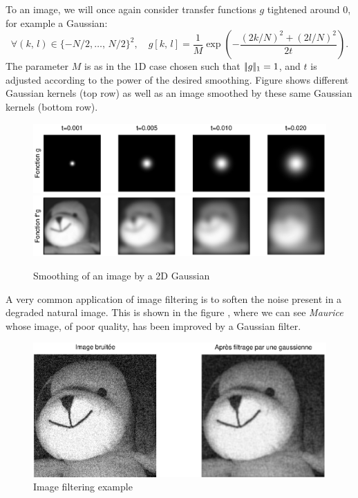  
To  an image, we will once again consider transfer functions $ g $ tightened around $ 0 $, for example a Gaussian:
\begin{equation*}
\forall (k, \, l) \in \{- N / 2, \ldots, \, N / 2 \}^2, \quad g [k, \, l] = \frac{1}{M} \exp \left(- \frac{(2 k / N)^2 + (2 l / N)^2}{2t} \right).
\end{equation*}
The parameter $ M $ is as in the 1D case chosen such that $ |\!| g |\!|_1 = 1 $, and $ t $ is adjusted according to the power of the desired smoothing. Figure  shows different Gaussian kernels (top row) as well as an image smoothed by these same Gaussian kernels (bottom row). \begin{figure}[ht]
    \begin{center}
    \includegraphics[scale=0.7]{images/filtre-gaussien-1.eps}
    \includegraphics[scale=0.7]{images/filtre-gaussien-2.eps}
    \end{center}
    \caption{Smoothing of an image by a 2D Gaussian}
              \label{fig-Gaussian-filter-2}
\end{figure}
 
 
 
A very common application of image filtering is to soften the noise present in a degraded natural image. This is shown in the figure , where we can see \textit{Maurice} whose image, of poor quality, has been improved by a Gaussian filter. 

\begin{figure}[ht]
    \begin{center}
    \includegraphics[scale=0.6]{images/filtre-2d.eps}
    \end{center}
    \caption{Image filtering example}
              \label{fig-filter-2d}
\end{figure}

